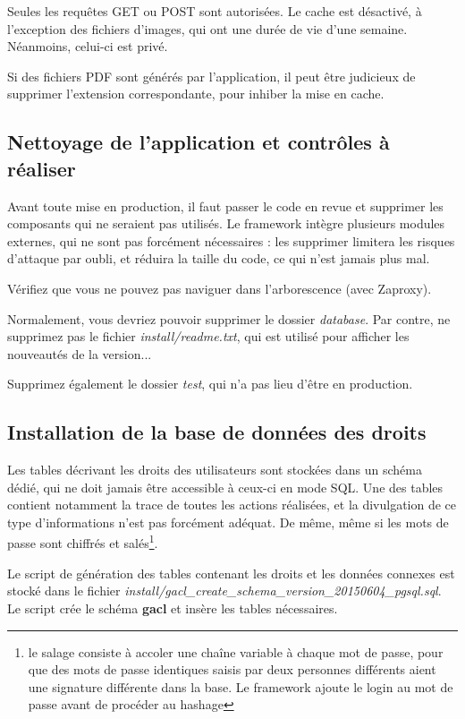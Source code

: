 Seules les requêtes GET ou POST sont autorisées. Le cache est désactivé, à l'exception des fichiers d'images, qui ont une durée de vie d'une semaine. Néanmoins, celui-ci est privé.

Si des fichiers PDF sont générés par l'application, il peut être judicieux de supprimer l'extension correspondante, pour inhiber la mise en cache.

\subsection{Nettoyage de l'application et contrôles à réaliser}

Avant toute mise en production, il faut passer le code en revue et supprimer les composants qui ne seraient pas utilisés. Le framework intègre plusieurs modules externes, qui ne sont pas forcément nécessaires : les supprimer limitera les risques d'attaque par oubli, et réduira la taille du code, ce qui n'est jamais plus mal.

Vérifiez que vous ne pouvez pas naviguer dans l'arborescence (avec Zaproxy).

Normalement, vous devriez pouvoir supprimer le dossier \textit{database}. Par contre, ne supprimez pas le fichier \textit{install/readme.txt}, qui est utilisé pour afficher les nouveautés de la version...

Supprimez également le dossier \textit{test}, qui n'a pas lieu d'être en production.

\subsection{Installation de la base de données des droits}

Les tables décrivant les droits des utilisateurs sont stockées dans un schéma dédié, qui ne doit jamais être accessible à ceux-ci en mode SQL. Une des tables contient notamment la trace de toutes les actions réalisées, et la divulgation de ce type d'informations n'est pas forcément adéquat. De même, même si les mots de passe sont chiffrés et salés\footnote{le salage consiste à accoler une chaîne variable à chaque mot de passe, pour que des mots de passe identiques saisis par deux personnes différents aient une signature différente dans la base. Le framework ajoute le login au mot de passe avant de procéder au hashage}.

Le script de génération des tables contenant les droits et les données connexes est stocké dans le fichier \textit{install/gacl\_create\_schema\_version\_20150604\_pgsql.sql}. Le script crée le schéma \textbf{gacl} et insère les tables nécessaires.

